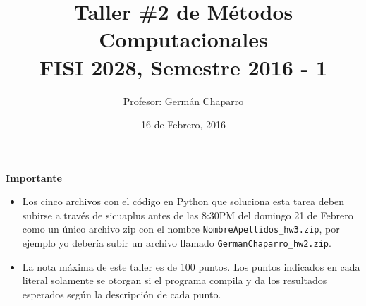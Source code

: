 \documentclass{article}
\title{Taller \#2 de M\'etodos Computacionales\\ FISI 2028, Semestre 2016 - 1}
\author{Profesor: Germ\'an Chaparro}
\date{16 de Febrero, 2016}
\begin{document}
\maketitle
\thispagestyle{empty}


{\bf Importante}
\begin{itemize}

\item Los cinco archivos con el c\'odigo en Python que soluciona esta
  tarea deben subirse a trav\'es de sicuaplus antes de las 8:30PM del
  domingo 21 de Febrero como un \'unico archivo zip con el nombre
  \verb"NombreApellidos_hw3.zip", por ejemplo yo deber\'ia subir un
  archivo llamado \verb"GermanChaparro_hw2.zip". 

\item La nota m\'axima de este taller es de 100 puntos. Los puntos indicados
  en cada literal solamente se otorgan si el programa compila y da los
  resultados esperados seg\'un la descripci\'on de cada punto.
 
\end{itemize}
\end{document}
